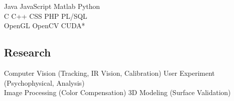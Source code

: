 \documentclass[]{resume-enhanced}
\begin{document}
\begin{minipage}[t]{0.40\textwidth}
Java \textbullet{} JavaScript \textbullet{} Matlab \textbullet{} Python \\
C \textbullet{} C++ \textbullet{} CSS \textbullet{} PHP \textbullet{} PL/SQL \\
OpenGL \textbullet{} OpenCV \textbullet{} CUDA* \\

\sectionsep

\subsection{Research}

Computer Vision (Tracking, IR Vision, Calibration) \textbullet{} User Experiment (Psychophysical, Analysis) \\
Image Processing (Color Compensation)  \textbullet{} 3D Modeling (Surface Validation) \\

\sectionsep

\end{minipage} 



\end{document}
